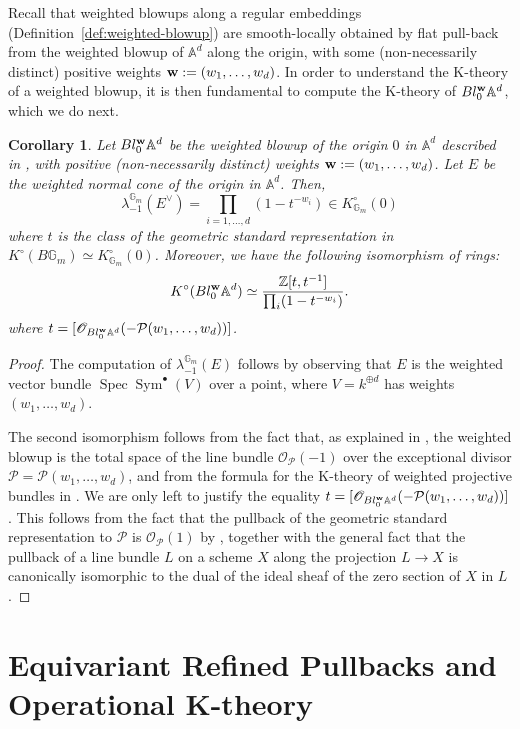 \documentclass[12pt]{amsart}
\newcommand\spec{\operatorname{Spec}}
\newcommand\G{\mathbb{G}}
\newcommand\Gm{\mathbb{G}_m}
\newcommand\A{\mathbb{A}}
\newcommand\Z{\mathbb{Z}}
\newcommand{\bA}{\mathbb{A}}
\newcommand{\sO}{\mathscr{O}}
\newcommand{\cP}{\mathcal{P}}
\newcommand{\Sym}{\operatorname{Sym}}
\newcommand{\Kring}{K^{\circ}}
\newtheorem{Corollary}[theorem]{Corollary}
\theoremstyle{definition}
\begin{document}
Recall that weighted blowups along a regular embeddings (Definition~\ref{def:weighted-blowup}) are smooth-locally obtained by flat pull-back from the weighted blowup of $\bA^d$ along the origin, with some (non-necessarily distinct) positive weights $\bold{w}:=(w_1,\dots, w_d)$. In order to understand the K-theory of a weighted blowup, it is then fundamental to compute the K-theory of $Bl^{\bold{w}}_0\bA^d$, which we do next.
\begin{Corollary} 
Let $Bl^{\bold{w}}_0\bA^d$ be the weighted blowup of the origin $0$ in $\bA^d$ described in , with positive (non-necessarily distinct) weights $\bold{w}:=(w_1,\dots, w_d)$. Let $E$ be the weighted normal cone of the origin in $\A^d$. Then,  
    $$  \lambda_{-1}^{\Gm}(E^{\vee}) = \prod_{i=1,\dots,d}(1-t^{-w_i})\in\Kring_{\Gm}(0)
    $$
    where $t$ is the class of the geometric standard representation in $\Kring(B\G_m) \simeq \Kring_{\G_m}(0)$. Moreover, we have the following isomorphism of rings:
    \[
    \Kring(Bl_0^{\bold{w}}\A^d)\simeq\frac{\Z[t,t^{-1}]}{\prod_{i}(1-t^{-w_i})}.
    \]
    where $t=[\sO_{Bl_0^{\bold{w}}\A^d}( -\mathcal{P}(w_1,\ldots,w_d))]$.
\end{Corollary}
     
\begin{proof}
    The computation of  $\lambda_{-1}^{\Gm}(E)$ follows by observing that $E$ is the weighted vector bundle $\spec \Sym^{\bullet}(V)$ over a point, where $V=k^{\oplus d}$ has weights $(w_1,\dots,w_d)$. 
    
    The second isomorphism follows from the fact that, as explained in , the weighted blowup is the total space of the line bundle $\sO_{\cP}(-1)$ over the exceptional divisor $\cP=\cP(w_1,\ldots,w_d)$, and from the formula for the K-theory of weighted projective bundles in . We are only left to justify the equality $t=[\sO_{Bl_0^{\bold{w}}\A^d}(-\mathcal{P}(w_1,\ldots,w_d))]$. This follows from the fact that the pullback of the geometric standard representation to $\cP$ is $\sO_{\cP}(1)$ by , together with the general fact that the pullback of a line bundle $L$ on a scheme $X$ along the projection $L \to X$ is canonically isomorphic to the dual of the ideal sheaf of the zero section of $X$ in $L$.
\end{proof}

\section{Equivariant Refined Pullbacks and Operational K-theory}\label{sec: gysin and operational}
\end{document}
